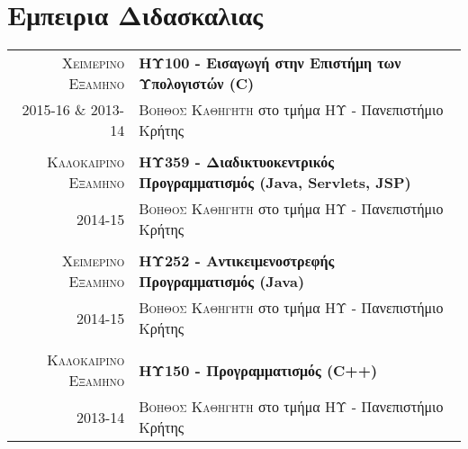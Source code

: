 \documentclass[11pt]{article}
\begin{document}

\section{Εμπειρια Διδασκαλιας}
\begin{longtable}{r|p{12.5cm}}
\textsc{Χειμερινο Εξαμηνο} & \textbf{ΗΥ100 - 	Εισαγωγή στην Επιστήμη των Υπολογιστών (C)}  \\
\textsc{2015-16 \& 2013-14} &\textsc{Βοηθος Καθηγητη} στο τμήμα ΗΥ - Πανεπιστήμιο Κρήτης\\

\multicolumn{2}{c}{} \\
\textsc{Καλοκαιρινο Εξαμηνο} & \textbf{ΗΥ359 - Διαδικτυοκεντρικός Προγραμματισμός (Java, Servlets, JSP)}  \\
\textsc{2014-15} &\textsc{Βοηθος Καθηγητη} στο τμήμα ΗΥ - Πανεπιστήμιο Κρήτης\\


\multicolumn{2}{c}{} \\
\textsc{Χειμερινο Εξαμηνο} & \textbf{ΗΥ252 - Αντικειμενοστρεφής Προγραμματισμός (Java)}  \\
\textsc{2014-15} &\textsc{Βοηθος Καθηγητη} στο τμήμα ΗΥ - Πανεπιστήμιο Κρήτης\\


\multicolumn{2}{c}{} \\
\textsc{Καλοκαιρινο Εξαμηνο} & \textbf{ΗΥ150 - Προγραμματισμός (C++)}  \\
\textsc{2013-14} &\textsc{Βοηθος Καθηγητη} στο τμήμα ΗΥ - Πανεπιστήμιο Κρήτης\\

\end{longtable}


\end{document}
